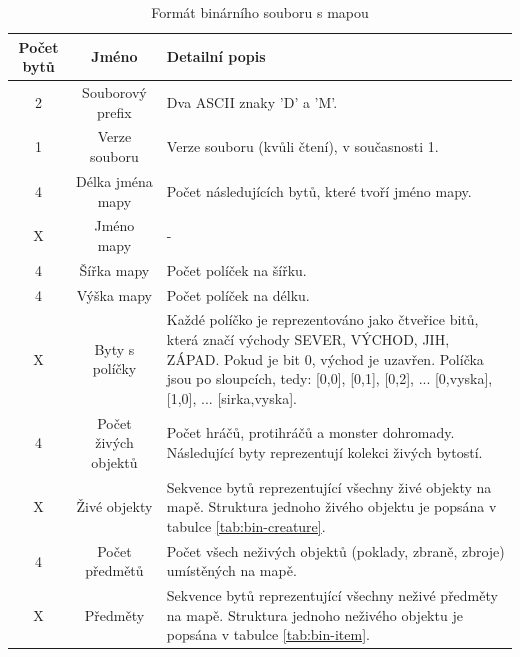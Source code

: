 \documentclass[11pt,a4paper]{scrartcl}
\begin{document}
	\begin{table}[H]
		\centering
		\begin{tabular}{|c|c|p{8cm}|}
			\hline
			Počet bytů & Jméno & Detailní popis \\
			\hline
			\hline
			2 & Souborový prefix & Dva ASCII znaky 'D' a 'M'. \\
			\hline
			1 & Verze souboru & Verze souboru (kvůli čtení), v současnosti 1. \\
			\hline
			\hline
			4 & Délka jména mapy & Počet následujících bytů, které tvoří jméno mapy. \\
			\hline
			X & Jméno mapy & - \\
			\hline
			4 & Šířka mapy & Počet políček na šířku.\\
			\hline
			4 & Výška mapy & Počet políček na délku. \\
			\hline
			X & Byty s políčky & Každé políčko je reprezentováno jako čtveřice bitů, která značí východy SEVER, VÝCHOD, JIH, ZÁPAD. Pokud je bit 0, východ je uzavřen. Políčka jsou po sloupcích, tedy: [0,0], [0,1], [0,2], ... [0,vyska], [1,0], ... [sirka,vyska]. \\	
			\hline
			\hline
			4 & Počet živých objektů & Počet hráčů, protihráčů a monster dohromady. Následující byty reprezentují kolekci živých bytostí.\\
			\hline
			X & Živé objekty & Sekvence bytů reprezentující všechny živé objekty na mapě. Struktura jednoho živého objektu je popsána v tabulce \ref{tab:bin-creature}. \\
			\hline
			\hline
			4 & Počet  předmětů & Počet všech neživých objektů (poklady, zbraně, zbroje) umístěných na mapě. \\
			\hline
			X & Předměty & Sekvence bytů reprezentující všechny neživé předměty na mapě. Struktura jednoho neživého objektu je popsána v tabulce \ref{tab:bin-item}. \\
			\hline
		\end{tabular}
		\caption{Formát binárního souboru s mapou}
		\label{tab:bin-map-file}
	\end{table}
	
\end{document}
